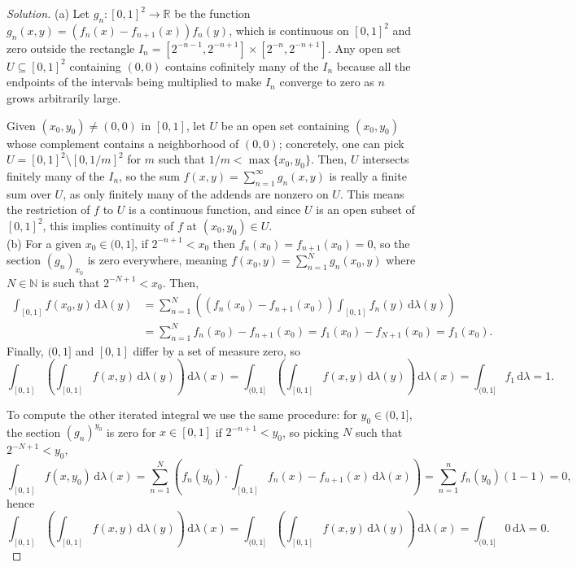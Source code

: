 \documentclass[10pt]{article}
\newcommand{\dd}{\,\mathrm{d}}
\providecommand{\NN}{\mathbb N}
\providecommand{\RR}{\mathbb R}
\newenvironment{soln}{\begin{proof}[Solution]}{\end{proof}}
\begin{document}
\begin{soln}
    (a) Let $g_n\colon[0,1]^2\to\RR$ be the function
    $g_n(x,y) = (f_n(x) - f_{n+1}(x))f_n(y)$, which is continuous on $[0,1]^2$
    and zero outside the rectangle
    $I_n = [2^{-n-1}, 2^{-n+1}]\times[2^{-n},2^{-n+1}]$.
    Any open set $U\subseteq[0,1]^2$
    containing $(0,0)$ contains cofinitely many of the $I_n$
    because all the endpoints of the intervals being multiplied to make $I_n$
    converge to zero as $n$ grows arbitrarily large.

    Given $(x_0,y_0)\ne(0,0)$ in $[0,1]$, let $U$ be an open set containing $(x_0,y_0)$
    whose complement contains a neighborhood of $(0,0)$;
    concretely, one can pick $U = [0,1]^2\setminus[0,1/m]^2$ for
    $m$ such that $1/m < \max\{x_0,y_0\}$.
    Then, $U$ intersects finitely many of the $I_n$,
    so the sum $f(x,y) = \sum_{n=1}^\infty g_n(x,y)$ is really a finite sum
    over $U$, as only finitely many of the addends are nonzero on $U$.
    This means the restriction of $f$ to $U$ is a continuous function,
    and since $U$ is an open subset of $[0,1]^2$,
    this implies continuity of $f$ at $(x_0,y_0)\in U$.
    \\

    (b) For a given $x_0\in(0,1]$, if $2^{-n+1} < x_0$ then
    $f_n(x_0) = f_{n+1}(x_0) = 0$, so the section $(g_n)_{x_0}$ is zero everywhere,
    meaning $f(x_0,y) = \sum_{n=1}^N g_n(x_0,y)$ where $N\in\NN$ is
    such that $2^{-N+1} < x_0$. Then,
    \begin{align*}
	\int_{[0,1]} f(x_0,y)\dd\lambda(y)
	&= \sum_{n=1}^N \left((f_n(x_0) - f_{n+1}(x_0))
	\int_{[0,1]} f_n(y)\dd\lambda(y)\right)\\
	&= \sum_{n=1}^N f_n(x_0) - f_{n+1}(x_0) = f_1(x_0) - f_{N+1}(x_0) = f_1(x_0).
    \end{align*}
    Finally, $(0,1]$ and $[0,1]$ differ by a set of measure zero, so
    \begin{equation*}
	\int_{[0,1]}\left(\int_{[0,1]}f(x,y)\dd\lambda(y)\right)\dd\lambda(x)
	= \int_{(0,1]} \left(\int_{[0,1]}f(x,y)\dd\lambda(y)\right)\dd\lambda(x)
	= \int_{(0,1]} f_1\dd\lambda = 1.
    \end{equation*}

    To compute the other iterated integral we use the same procedure:
    for $y_0\in(0,1]$, the section $(g_n)^{y_0}$ is zero for $x\in[0,1]$
    if $2^{-n+1} < y_0$, so picking $N$ such that $2^{-N+1} < y_0$,
    \begin{equation*}
        \int_{[0,1]} f(x,y_0)\dd\lambda(x)
	= \sum_{n=1}^N \left(f_n(y_0)\cdot
	\int_{[0,1]} f_n(x) - f_{n+1}(x)\dd\lambda(x)\right)
	= \sum_{n=1}^n f_n(y_0)(1-1) = 0,
    \end{equation*}
    hence
    \begin{equation*}
	\int_{[0,1]}\left(\int_{[0,1]}f(x,y)\dd\lambda(y)\right)\dd\lambda(x)
	= \int_{(0,1]}\left(\int_{[0,1]}f(x,y)\dd\lambda(y)\right)\dd\lambda(x)
	= \int_{(0,1]} 0\dd\lambda = 0.
    \end{equation*}


\end{soln}
\end{document}
